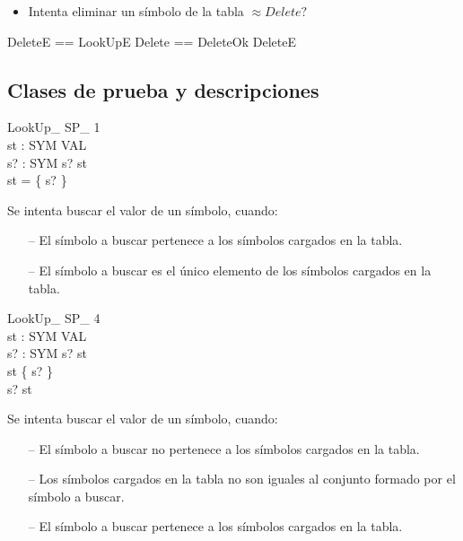 \begin{itemize}
  \item Intenta eliminar un símbolo de la tabla $\approx Delete?$ \\
\end{itemize}

\begin{zed}
DeleteE == LookUpE \also
Delete == DeleteOk \lor DeleteE
\end{zed}

\subsection*{Clases de prueba y descripciones}

\begin{schema}{LookUp\_ SP\_ 1}\\
 st : SYM \pfun VAL \\
 s? : SYM 
\where
 s? \in \dom st \\
 \dom st = \{ s? \}
\end{schema}

\begin{tcolorbox}[colback=gray!5!white,colframe=gray!50!black,
  colbacktitle=gray!75!black,title=LookUp\_ SP\_ 1]
  Se intenta buscar el valor de un símbolo, cuando:
     \begin{itemize}
        \item[--]{El símbolo a buscar pertenece a los símbolos cargados en la tabla.}
        \item[--]{El símbolo a buscar es el único elemento de los símbolos cargados en la tabla.}
     \end{itemize}
\end{tcolorbox}

\begin{schema}{LookUp\_ SP\_ 4}\\
 st : SYM \pfun VAL \\
 s? : SYM 
\where
 s? \notin \dom st \\
 \dom st \neq \{ s? \} \\
 s? \in \dom st
\end{schema}

\begin{tcolorbox}[colback=gray!5!white,colframe=gray!50!black,
  colbacktitle=gray!75!black,title=LookUp\_ SP\_ 4]
  Se intenta buscar el valor de un símbolo, cuando:
     \begin{itemize}
        \item[--]{El símbolo a buscar no pertenece a los símbolos cargados en la tabla.}
        \item[--]{Los símbolos cargados en la tabla no son iguales al conjunto formado por el símbolo a buscar.}
        \item[--]{El símbolo a buscar pertenece a los símbolos cargados en la tabla.}
     \end{itemize}
\end{tcolorbox}

